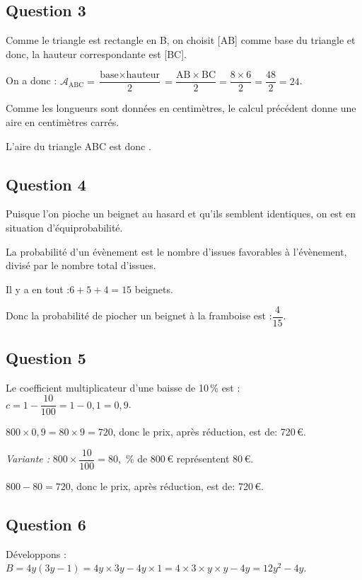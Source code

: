 \documentclass[12pt,a4paper,french]{article}
\begin{document}
\subsection*{Question 3}
	Comme le triangle est rectangle en B, on choisit [AB] comme base du triangle et donc, la hauteur correspondante est [BC].

	On a donc : \quad $\mathcal{A}_{\mathrm{ABC}} = \dfrac{\text{base} \times \text{hauteur}}{2} = \dfrac{\mathrm{AB} \times \mathrm{BC}}{2} = \dfrac{8 \times 6}{2} = \dfrac{48}{2} = 24$.

	Comme les longueurs sont données en centimètres, le calcul précédent donne une aire en centimètres carrés.

	L'aire du triangle ABC est donc \quad {}.

\subsection*{Question 4}
	Puisque l'on pioche un beignet au hasard et qu'ils semblent identiques, on est en situation d'équiprobabilité.

	La probabilité d'un évènement est le nombre d'issues favorables à l'évènement, divisé par le nombre total d'issues.

	Il y a en tout :\quad $6 + 5 + 4 = 15$ beignets.

	Donc la probabilité de piocher un beignet à la framboise est :\quad $\dfrac{4}{15}$.

\subsection*{Question 5}
	Le coefficient multiplicateur d'une baisse de 10\,\% est : \quad $c = 1 - \dfrac{10}{100} = 1 - 0,1 = 0,9$.

 $800 \times 0,9 = 80 \times 9 =  720$, donc le prix, après réduction, est de: 720\,\euro{}.

	\emph{Variante :} $800 \times \dfrac{10}{100} = 80$, \,\% de 800\,\euro{} représentent 80\,\euro{}.

$800 - 80 = 720$, donc le prix, après réduction, est de: 720\,\euro{}.

\subsection*{Question 6}
	Développons : \quad $B = 4y(3y - 1) = 4y \times 3y - 4y \times 1 = 4 \times 3 \times y \times y - 4y = 12y^2 - 4y$.
\end{document}
